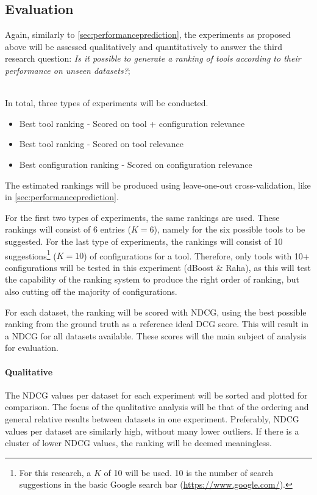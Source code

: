 \subsection{Evaluation}
Again, similarly to \autoref{sec:performanceprediction}, the experiments as proposed above will be assessed qualitatively and quantitatively to answer the third research question: \textit{Is it possible to generate a ranking of tools according to their performance on unseen datasets?}; 

~\\In total, three types of experiments will be conducted. 
\begin{itemize}
    \item Best tool ranking - Scored on tool + configuration relevance
    \item Best tool ranking - Scored on tool relevance
    \item Best configuration ranking - Scored on configuration relevance
\end{itemize}

The estimated rankings will be produced using leave-one-out cross-validation, like in \autoref{sec:performanceprediction}. 

For the first two types of experiments, the same rankings are used. These rankings will consist of 6 entries ($K = 6$), namely for the six possible tools to be suggested. 
For the last type of experiments, the rankings will consist of 10 suggestions\footnote{For this research, a $K$ of 10 will be used. 10 is the number of search suggestions in the basic Google search bar (\url{https://www.google.com/}).} ($K = 10$) of configurations for a tool. Therefore, only tools with 10+ configurations will be tested in this experiment (dBoost \& Raha), as this will test the capability of the ranking system to produce the right order of ranking, but also cutting off the majority of configurations.

For each dataset, the ranking will be scored with NDCG, using the best possible ranking from the ground truth as a reference ideal DCG score. This will result in a NDCG for all datasets available. These scores will the main subject of analysis for evaluation.

\paragraph{Qualitative} The NDCG values per dataset for each experiment will be sorted and plotted for comparison. The focus of the qualitative analysis will be that of the ordering and general relative results between datasets in one experiment. Preferably, NDCG values per dataset are similarly high, without many lower outliers. If there is a cluster of lower NDCG values, the ranking will be deemed meaningless.


